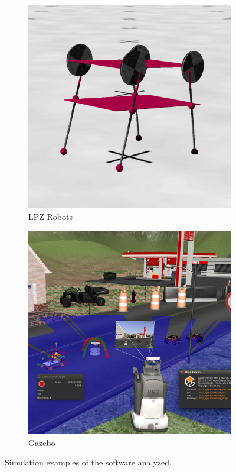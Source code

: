 \begin{figure}[hb!]
\begin{subfigure}{.33\textwidth}
    \includegraphics[width=.95\linewidth]{figures/lpzrobots_example}
    \caption{LPZ Robots}
    \label{fig:lpzrobots_example}
  \end{subfigure}
  \begin{subfigure}{.33\textwidth}
    \centering
    \includegraphics[width=.95\linewidth]{figures/gazebo_example}
    \caption{Gazebo}
    \label{fig:gazebo_example}
  \end{subfigure}
  \caption{Simulation examples of the software analyzed.}
  \label{fig:simulation_comparison}
\end{figure}

